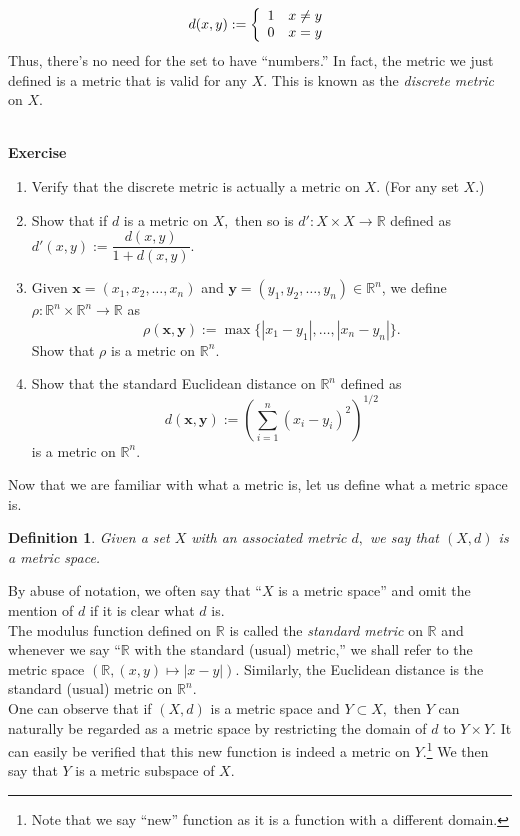 \documentclass[12pt]{article}
\newtheorem{defn}{Definition}
\newcounter{exercise}
\newcommand{\exercise}{\refstepcounter{exercise}\par\medskip
   {\textbf{Exercise \theexercise }} \rmfamily}
\begin{document}
	\[d(x, y) := \left\{\begin{array}{c r}
		1 & x \neq y\\
		0 & x = y
	\end{array}
	\right.\]
	Thus, there's no need for the set to have ``numbers.'' In fact, the metric we just defined is a metric that is valid for any $X.$ This is known as the \emph{discrete metric} on $X.$\\~\\
	\exercise
	\begin{enumerate}[nosep]\label{ex:standard-metrics}
		\item Verify that the discrete metric is actually a metric on $X.$ (For any set $X.$)
		\item Show that if $d$ is a metric on $X,$ then so is $d' : X \times X \to \mathbb{R}$ defined as $d'(x, y) := \dfrac{d(x, y)}{1 + d(x, y)}.$
		\item Given $\textbf{x} = (x_1, x_2, \ldots, x_n)$ and $\textbf{y} = (y_1, y_2, \ldots, y_n) \in \mathbb{R}^n$, we define $\rho:\mathbb{R}^n\times \mathbb{R}^n \to \mathbb{R}$ as
		\[\rho(\textbf{x}, \textbf{y}) := \max\{|x_1 - y_1|, \ldots, |x_n - y_n|\}.\]
		Show that $\rho$ is a metric on $\mathbb{R}^n.$
		\item Show that the standard Euclidean distance on $\mathbb{R}^n$ defined as 
		\[d(\textbf{x}, \textbf{y}) := \left(\sum_{i=1}^{n}(x_i - y_i)^2\right)^{1/2}\]
		is a metric on $\mathbb{R}^n.$
	\end{enumerate}
	Now that we are familiar with what a metric is, let us define what a metric space is.
	\begin{defn}
		Given a set $X$ with an associated metric $d,$ we say that $(X, d)$ is a metric space.
	\end{defn}
	By abuse of notation, we often say that ``$X$ is a metric space'' and omit the mention of $d$ if it is clear what $d$ is.\\
	The modulus function defined on $\mathbb{R}$ is called the \emph{standard metric} on $\mathbb{R}$ and whenever we say ``$\mathbb{R}$ with the standard (usual) metric,'' we shall refer to the metric space $(\mathbb{R}, (x, y) \mapsto |x - y|).$ Similarly, the Euclidean distance is the standard (usual) metric on $\mathbb{R}^n.$\\
	One can observe that if $(X, d)$ is a metric space and $Y \subset X,$ then $Y$ can naturally be regarded as a metric space by restricting the domain of $d$ to $Y \times Y.$ It can easily be verified that this new function is indeed a metric on $Y.$\footnote{Note that we say ``new'' function as it is a function with a different domain.} We then say that $Y$ is a metric subspace of $X.$
\end{document}
